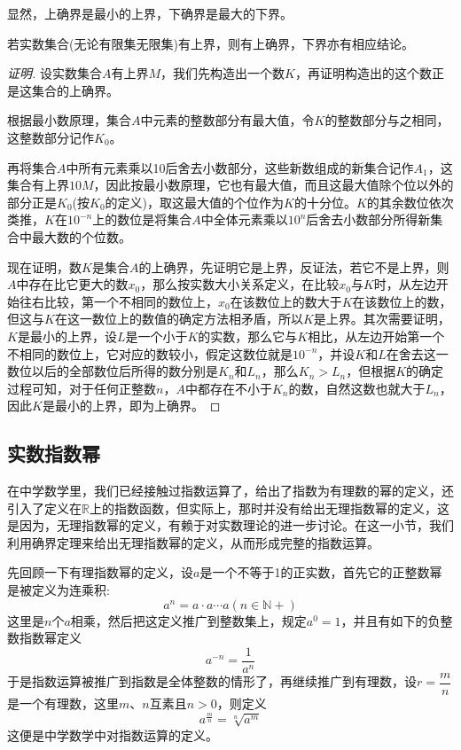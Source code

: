 显然，上确界是最小的上界，下确界是最大的下界。

\begin{theorem}[确界定理]
若实数集合(无论有限集无限集)有上界，则有上确界，下界亦有相应结论。
\end{theorem}

\begin{proof}[证明]
设实数集合$A$有上界$M$，我们先构造出一个数$K$，再证明构造出的这个数正是这集合的上确界。

根据最小数原理，集合$A$中元素的整数部分有最大值，令$K$的整数部分与之相同，这整数部分记作$K_0$。

再将集合$A$中所有元素乘以10后舍去小数部分，这些新数组成的新集合记作$A_1$，这集合有上界$10M$，因此按最小数原理，它也有最大值，而且这最大值除个位以外的部分正是$K_0$(按$K_0$的定义)，取这最大值的个位作为$K$的十分位。$K$的其余数位依次类推，$K$在$10^{-n}$上的数位是将集合$A$中全体元素乘以$10^n$后舍去小数部分所得新集合中最大数的个位数。

现在证明，数$K$是集合$A$的上确界，先证明它是上界，反证法，若它不是上界，则$A$中存在比它更大的数$x_0$，那么按实数大小关系定义，在比较$x_0$与$K$时，从左边开始往右比较，第一个不相同的数位上，$x_0$在该数位上的数大于$K$在该数位上的数，但这与$K$在这一数位上的数值的确定方法相矛盾，所以$K$是上界。其次需要证明，$K$是最小的上界，设$L$是一个小于$K$的实数，那么它与$K$相比，从左边开始第一个不相同的数位上，它对应的数较小，假定这数位就是$10^{-n}$，并设$K$和$L$在舍去这一数位以后的全部数位后所得的数分别是$K_n$和$L_n$，那么$K_n>L_n$，但根据$K$的确定过程可知，对于任何正整数$n$，$A$中都存在不小于$K_n$的数，自然这数也就大于$L_n$，因此$K$是最小的上界，即为上确界。
\end{proof}

\subsection{实数指数幂}
\label{sec:real-exponential-power}

在中学数学里，我们已经接触过指数运算了，给出了指数为有理数的幂的定义，还引入了定义在$\mathbb{R}$上的指数函数，但实际上，那时并没有给出无理指数幂的定义，这是因为，无理指数幂的定义，有赖于对实数理论的进一步讨论。在这一小节，我们利用确界定理来给出无理指数幂的定义，从而形成完整的指数运算。

先回顾一下有理指数幂的定义，设$a$是一个不等于1的正实数，首先它的正整数幂是被定义为连乘积:
\[ a^n = a \cdot a \cdots a (n \in \mathbb{N+}) \]
这里是$n$个$a$相乘，然后把这定义推广到整数集上，规定$a^0=1$，并且有如下的负整数指数幂定义
\[ a^{-n}=\frac{1}{a^n} \]
于是指数运算被推广到指数是全体整数的情形了，再继续推广到有理数，设$r=\dfrac{m}{n}$是一个有理数，这里$m$、$n$互素且$n>0$，则定义
\[ a^{\frac{m}{n}} = \sqrt[n]{a^m} \]
这便是中学数学中对指数运算的定义。


